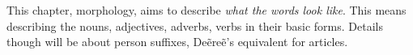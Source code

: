 This chapter, morphology, aims to describe \emph{what the words look like}. This means describing
the nouns, adjectives, adverbs, verbs in their basic forms. Details though will be about person
suffixes, Deẽreẽ’s equivalent for articles.






